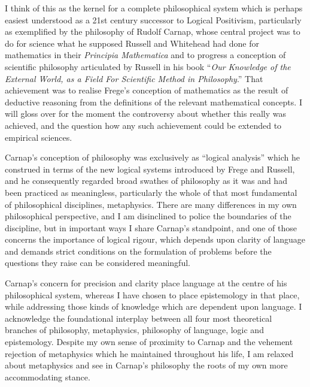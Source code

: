 \documentclass[10pt,titlepage]{book}
\begin{document}
I think of this as the kernel for a complete philosophical system which is perhaps easiest understood as a 21st century successor to Logical Positivism, particularly as exemplified by the philosophy of Rudolf Carnap, whose central project was to do for science what he supposed Russell and Whitehead had done for mathematics in their \emph{Principia Mathematica} \cite{russell1913} and to progress a conception of scientific philosophy articulated by Russell in his book ``\emph{Our Knowledge of the External World, as a Field For Scientific Method in Philosophy}.'' \cite{russell21}
That achievement was to realise Frege’s conception of mathematics as the result of deductive reasoning from the definitions of the relevant mathematical concepts.
I will gloss over for the moment the controversy about whether this really was achieved, and the question how any such achievement could be extended to empirical sciences.

Carnap’s conception of philosophy was exclusively as ``logical analysis'' which he construed in terms of the new logical systems introduced by Frege and Russell, and he consequently regarded broad swathes of philosophy as it was and had been practiced as meaningless, particularly the whole of that most fundamental of philosophical disciplines, metaphysics.
There are many differences in my own philosophical perspective, and I am disinclined to police the boundaries of the discipline, but in important ways I share Carnap’s standpoint, and one of those concerns the importance of logical rigour, which depends upon clarity of language and demands strict conditions on the formulation of problems before the questions they raise can be considered meaningful.

Carnap’s concern for precision and clarity place language at the centre of his philosophical system, whereas I have chosen to place epistemology in that place, while addressing those kinds of knowledge which are dependent upon language.
I acknowledge the foundational interplay between all four most theoretical branches of philosophy, metaphysics, philosophy of language, logic and epistemology.
Despite my own sense of proximity to Carnap and the vehement rejection of metaphysics which he maintained throughout his life, I am relaxed about metaphysics and see in Carnap’s philosophy the roots of my own more accommodating stance.
\end{document}
